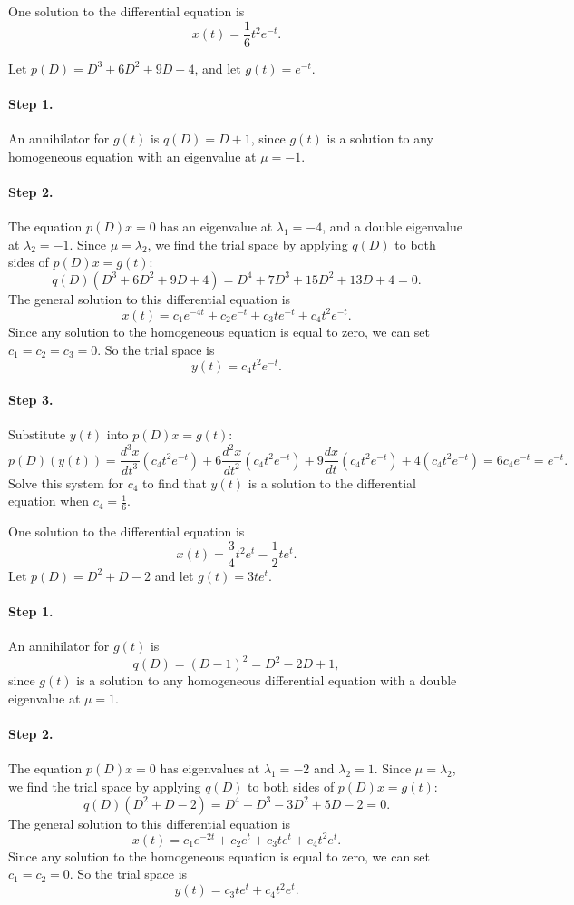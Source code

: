 \documentclass{ximera}
\begin{document}
\newpage
{} \ans One solution to the differential equation is
\[
x(t) = \frac{1}{6}t^2e^{-t}.
\]

\soln Let $p(D) = D^3 + 6D^2 + 9D + 4$, and let $g(t) = e^{-t}$.
\paragraph{Step 1.} An annihilator for $g(t)$ is $q(D) = D + 1$, since
$g(t)$ is a solution to any homogeneous equation with an eigenvalue at
$\mu = -1$.

\paragraph{Step 2.} The equation $p(D)x = 0$ has an eigenvalue at
$\lambda_1 = -4$, and a double eigenvalue at $\lambda_2 = -1$.  Since
$\mu = \lambda_2$, we find the trial space by applying $q(D)$ to both
sides of $p(D)x = g(t)$:
\[
q(D)(D^3 + 6D^2 + 9D + 4) = D^4 + 7D^3 + 15D^2 + 13D + 4 = 0.
\]
The general solution to this differential equation is
\[
x(t) = c_1e^{-4t} + c_2e^{-t} + c_3te^{-t} + c_4t^2e^{-t}.
\]
Since any solution to the homogeneous equation is equal to zero, we can set
$c_1 = c_2 = c_3 = 0$.  So the trial space is
\[
y(t) = c_4t^2e^{-t}.
\]
\paragraph{Step 3.} Substitute $y(t)$ into $p(D)x = g(t)$:
\[
p(D)(y(t)) = \frac{d^3x}{dt^3}(c_4t^2e^{-t}) +
6\frac{d^2x}{dt^2}(c_4t^2e^{-t}) + 9\frac{dx}{dt}(c_4t^2e^{-t}) +
4(c_4t^2e^{-t}) = 6c_4e^{-t} =  e^{-t}.
\]
Solve this system for $c_4$ to find that $y(t)$ is a solution to the
differential equation when $c_4 = \frac{1}{6}$.

 \ans One solution to the differential equation is
\[
x(t) = \frac{3}{4}t^2e^t - \frac{1}{2}te^t.
\]
\soln Let $p(D) = D^2 + D - 2$ and let $g(t) = 3te^t$.

\paragraph{Step 1.} An annihilator for $g(t)$ is
\[
q(D) = (D - 1)^2 = D^2 - 2D + 1,
\]
since $g(t)$ is a solution to any homogeneous differential equation
with a double eigenvalue at $\mu = 1$.

\paragraph{Step 2.} The equation $p(D)x = 0$ has eigenvalues at
$\lambda_1 = -2$ and $\lambda_2 = 1$.  Since $\mu = \lambda_2$, we
find the trial space by applying $q(D)$ to both sides of $p(D)x =
g(t)$:
\[
q(D)(D^2 + D - 2) = D^4 - D^3 - 3D^2 + 5D - 2 = 0.
\]
The general solution to this differential equation is
\[
x(t) = c_1e^{-2t} + c_2e^t + c_3te^t + c_4t^2e^t.
\]
Since any solution to the homogeneous equation is equal to zero, we can set
$c_1 = c_2 = 0$.  So the trial space is
\[
y(t) = c_3te^t + c_4t^2e^t.
\]
\end{document}
